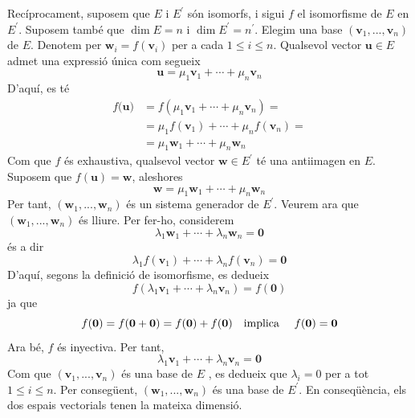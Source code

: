 \begin{prova}
Recíprocament, suposem que $E$ i $E^{\prime }$
són isomorfs, i sigui $f$ el isomorfisme de $E$ en $E%
^{\prime }$. Suposem també que $\dim E=n$ i $\dim E^{\prime }=n^{\prime }$. Elegim una base $(\mathbf{v}_{1},...,\mathbf{v}%
_{n})$ de $E$. Denotem per $\mathbf{w}_{i}=f(\mathbf{v}_{i})$
per a cada $1\leq i\leq n$. Qualsevol vector $\mathbf{u}\in E$
admet una expressió única com segueix%
\begin{equation*}
\mathbf{u}=\mu _{1}\mathbf{v}_{1}+\cdots +\mu _{n}\mathbf{v}_{n}
\end{equation*}%
D’aquí, es té 
\begin{align*}
f(\mathbf{u)} &=f(\mu _{1}\mathbf{v}_{1}+\cdots +\mu _{n}\mathbf{v}_{n})= \\
&=\mu _{1}f(\mathbf{v}_{1})+\cdots +\mu _{n}f(\mathbf{v}_{n})= \\
&=\mu _{1}\mathbf{w}_{1}+\cdots +\mu _{n}\mathbf{w}_{n}
\end{align*}%
Com que $f$ és exhaustiva, qualsevol vector $\mathbf{w}\in E%
^{\prime }$ té una antiimagen en $E$. Suposem que $f(\mathbf{u%
})=\mathbf{w}$, aleshores%
\begin{equation*}
\mathbf{w}=\mu _{1}\mathbf{w}_{1}+\cdots +\mu _{n}\mathbf{w}_{n}
\end{equation*}%
Per tant, $(\mathbf{w}_{1},...,\mathbf{w}_{n})$ és un sistema generador de $%
E^{\prime }$. Veurem ara que $(\mathbf{w}_{1},...,\mathbf{w}%
_{n})$ és lliure. Per fer-ho, considerem%
\begin{equation*}
\lambda _{1}\mathbf{w}_{1}+\cdots +\lambda _{n}\mathbf{w}_{n}=\mathbf{0}
\end{equation*}%
és a dir%
\begin{equation*}
\lambda _{1}f(\mathbf{v}_{1})+\cdots +\lambda _{n}f(\mathbf{v}_{n})=\mathbf{0%
}
\end{equation*}%
D’aquí, segons la definició de isomorfisme, es dedueix%
\begin{equation*}
f(\lambda _{1}\mathbf{v}_{1}+\cdots +\lambda _{n}\mathbf{v}_{n})=f(\mathbf{0}%
)
\end{equation*}%
ja que 
\begin{equation*}
f(\mathbf{0})=f(\mathbf{0}+\mathbf{0})=f(\mathbf{0})+f(\mathbf{0})\text{ \ \
implica \ \ \ }f(\mathbf{0})=\mathbf{0}
\end{equation*}%
Ara bé, $f$ és inyectiva. Per tant,%
\begin{equation*}
\lambda _{1}\mathbf{v}_{1}+\cdots +\lambda _{n}\mathbf{v}_{n}=\mathbf{0}
\end{equation*}%
Com que $(\mathbf{v}_{1},...,\mathbf{v}_{n})$ és una base de $E$%
, es dedueix que $\lambda _{i}=0$ per a tot $1\leq i\leq n$. Per consegüent, 
$(\mathbf{w}_{1},...,\mathbf{w}_{n})$ és una base de $E^{\prime }$.
En conseqüència, els dos espais vectorials tenen la mateixa dimensió.
\end{prova}

